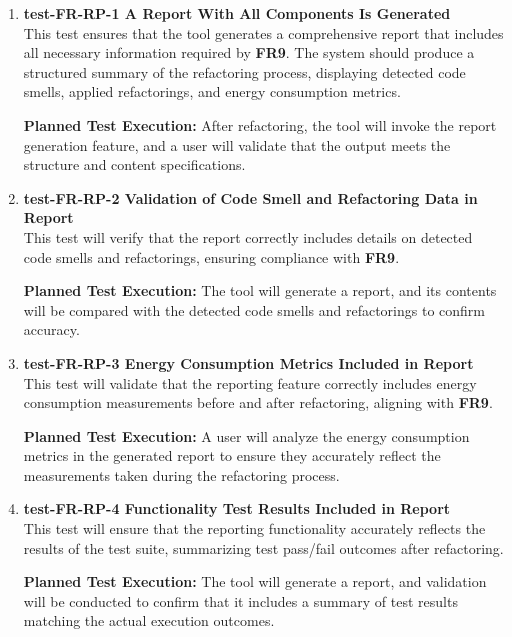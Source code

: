 \documentclass[12pt, titlepage]{article}
\begin{document}
\begin{enumerate}
  \item \textbf{test-FR-RP-1 A Report With All Components Is Generated} \\[2mm]
    This test ensures that the tool generates a comprehensive report
    that includes all necessary information required by \textbf{FR9}.
    The system should produce a structured summary of the refactoring
    process, displaying detected code smells, applied refactorings,
    and energy consumption metrics.

    \textbf{Planned Test Execution:} After refactoring, the tool will
    invoke the report generation feature, and a user will validate
    that the output meets the structure and content specifications.

  \item \textbf{test-FR-RP-2 Validation of Code Smell and Refactoring
    Data in Report} \\[2mm]
    This test will verify that the report correctly includes details
    on detected code smells and refactorings, ensuring compliance
    with \textbf{FR9}.

    \textbf{Planned Test Execution:} The tool will generate a report,
    and its contents will be compared with the detected code smells
    and refactorings to confirm accuracy.

  \item \textbf{test-FR-RP-3 Energy Consumption Metrics Included in
    Report} \\[2mm]
    This test will validate that the reporting feature correctly
    includes energy consumption measurements before and after
    refactoring, aligning with \textbf{FR9}.

    \textbf{Planned Test Execution:} A user will analyze the energy
    consumption metrics in the generated report to ensure they
    accurately reflect the measurements taken during the refactoring process.

  \item \textbf{test-FR-RP-4 Functionality Test Results Included in
    Report} \\[2mm]
    This test will ensure that the reporting functionality accurately
    reflects the results of the test suite, summarizing test
    pass/fail outcomes after refactoring.

    \textbf{Planned Test Execution:} The tool will generate a report,
    and validation will be conducted to confirm that it includes a
    summary of test results matching the actual execution outcomes.
\end{enumerate}
\end{document}
